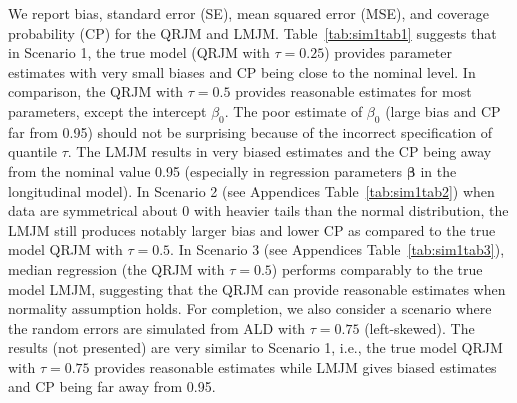 We report bias, standard error (SE), mean squared error (MSE), and coverage probability (CP) for the QRJM and LMJM. Table~\ref{tab:sim1tab1} suggests that in Scenario 1, the true model (QRJM with $\tau=0.25$) provides parameter estimates with very small biases and CP being close to the nominal level. In comparison, the QRJM with $\tau=0.5$ provides reasonable estimates for most parameters, except the intercept $\beta_0$. The poor estimate of $\beta_0$ (large bias and CP far from 0.95) should not be surprising because of the incorrect specification of quantile $\tau$. The LMJM results in very biased estimates and the CP being away from the nominal value 0.95 (especially in regression parameters $\boldsymbol{\beta}$ in the longitudinal model). In Scenario 2 (see Appendices Table~\ref{tab:sim1tab2}) when data are symmetrical about 0 with heavier tails than the normal distribution, the LMJM still produces notably larger bias and lower CP as compared to the true model QRJM with $\tau=0.5$. In Scenario 3 (see Appendices Table~\ref{tab:sim1tab3}), median regression (the QRJM with $\tau=0.5$) performs comparably to the true model LMJM, suggesting that the QRJM can provide reasonable estimates when normality assumption holds. For completion, we also consider a scenario where the random errors are simulated from ALD with $\tau=0.75$ (left-skewed). The results (not presented) are very similar to Scenario 1, i.e., the true model QRJM with $\tau=0.75$ provides reasonable estimates while LMJM gives biased estimates and CP being far away from 0.95.
